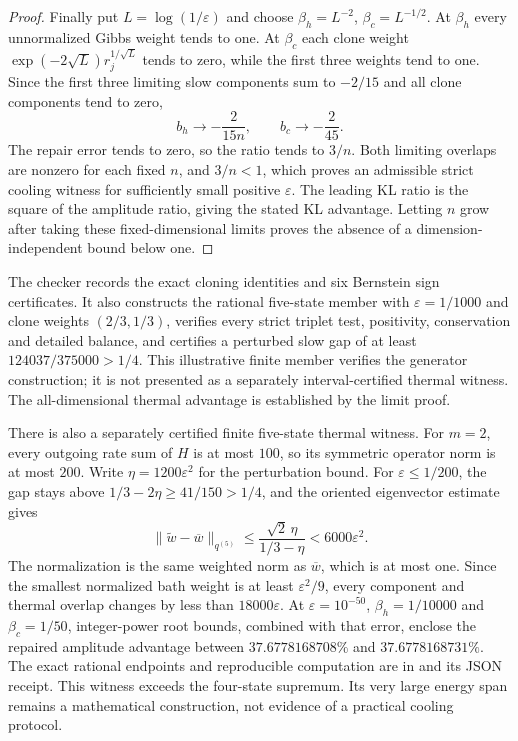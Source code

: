 \documentclass[11pt]{article}
\begin{document}
\begin{proof}
Finally put $L=\log(1/\varepsilon)$ and choose
$\beta_h=L^{-2}$, $\beta_c=L^{-1/2}$. At $\beta_h$ every unnormalized
Gibbs weight tends to one. At $\beta_c$ each clone weight
$\exp(-2\sqrt L)r_j^{1/\sqrt L}$ tends to zero, while the first three
weights tend to one. Since the first three limiting slow components
sum to $-2/15$ and all clone components tend to zero,
\[
b_h\longrightarrow-\frac{2}{15n},\qquad
b_c\longrightarrow-\frac2{45}.
\]
The repair error tends to zero, so the ratio tends to $3/n$.
Both limiting overlaps are nonzero for each fixed $n$, and $3/n<1$,
which proves an admissible strict cooling witness for sufficiently
small positive $\varepsilon$. The leading KL ratio is the square of
the amplitude ratio, giving the stated KL advantage. Letting $n$
grow after taking these fixed-dimensional limits proves the absence
of a dimension-independent bound below one.
\end{proof}

The checker 
records the exact cloning identities and six Bernstein sign certificates.
It also constructs the rational five-state member with
$\varepsilon=1/1000$ and clone weights $(2/3,1/3)$, verifies every strict
triplet test, positivity, conservation and detailed balance, and certifies
a perturbed slow gap of at least $124037/375000>1/4$.
This illustrative finite member verifies the generator construction; it
is not presented as a separately interval-certified thermal witness.
The all-dimensional thermal advantage is established by the limit proof.

There is also a separately certified finite five-state thermal witness.
For $m=2$, every outgoing rate sum of $H$ is at most $100$, so its
symmetric operator norm is at most $200$. Write
$\eta=1200\varepsilon^2$ for the perturbation bound. For
$\varepsilon\leq1/200$, the gap stays above
$1/3-2\eta\geq41/150>1/4$, and the oriented eigenvector estimate gives
\[
\|\widetilde w-\overline w\|_{q^{(5)}}
\leq\frac{\sqrt2\,\eta}{1/3-\eta}<6000\varepsilon^2.
\]
The normalization is the same weighted norm as $\overline w$, which is
at most one. Since the smallest normalized bath weight is at least
$\varepsilon^2/9$, every component and thermal overlap changes by less
than $18000\varepsilon$.
At $\varepsilon=10^{-50}$, $\beta_h=1/10000$ and $\beta_c=1/50$,
integer-power root bounds, combined with that error, enclose the repaired
amplitude advantage between $37.6778168708\%$ and $37.6778168731\%$.
The exact rational endpoints and reproducible computation are in
 and its JSON
receipt. This witness exceeds the four-state supremum. Its very large
energy span remains a mathematical construction, not evidence of a
practical cooling protocol.
\end{document}
